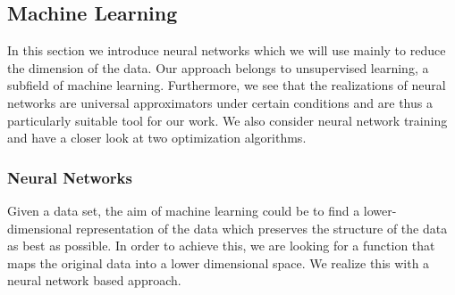 \documentclass[11pt,titlepage]{article}
\theoremstyle{definition}
\theoremstyle{remark}
\begin{document}
	\subsection{Machine Learning}
	
	In this section we introduce neural networks which we will use mainly to reduce the dimension of the data. Our approach belongs to unsupervised learning, a subfield of machine learning. Furthermore, we see that the realizations of neural networks are universal approximators under certain conditions and are thus a particularly suitable tool for our work. We also consider 
	neural network training and have a closer look at two optimization algorithms.
	
	\subsubsection{Neural Networks}\label{subsec NNs}
		
	Given a data set, the aim of machine learning could be to find a lower-dimensional representation of the data which preserves the structure of the data as best as possible. In order to achieve this, we are looking for a function that maps the original data into a lower dimensional space. We realize this with a neural network based approach.
	
\end{document}
